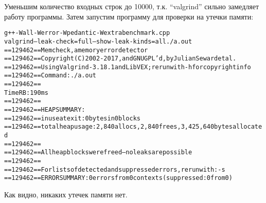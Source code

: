 Уменьшим количество входных строк до 10000, т.к. \enquote{valgrind} сильно замедляет работу программы. Затем запустим программу для проверки на утечки памяти:


\begin{alltt}
 g++ -Wall -Werror -Wpedantic -Wextra benchmark.cpp
 valgrind --leak-check=full --show-leak-kinds=all ./a.out
==129462== Memcheck, a memory error detector
==129462== Copyright (C) 2002-2017, and GNU GPL'd, by Julian Seward et al.
==129462== Using Valgrind-3.18.1 and LibVEX; rerun with -h for copyright info
==129462== Command: ./a.out
==129462== 
Time RB: 190 ms
==129462== 
==129462== HEAP SUMMARY:
==129462==     in use at exit: 0 bytes in 0 blocks
==129462==   total heap usage: 2,840 allocs, 2,840 frees, 3,425,640 bytes allocated
==129462== 
==129462== All heap blocks were freed -- no leaks are possible
==129462== 
==129462== For lists of detected and suppressed errors, rerun with: -s
==129462== ERROR SUMMARY: 0 errors from 0 contexts (suppressed: 0 from 0)
\end{alltt}

Как видно, никаких утечек памяти нет.

\pagebreak


